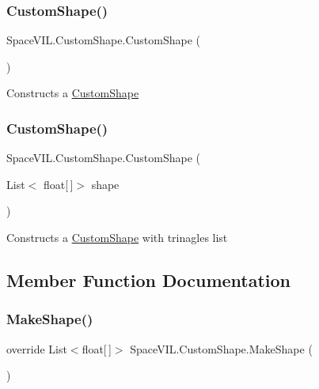 \subsubsection{\texorpdfstring{Custom\+Shape()}{CustomShape()}\hspace{0.1cm}{\footnotesize\ttfamily [1/2]}}
{\footnotesize\ttfamily Space\+V\+I\+L.\+Custom\+Shape.\+Custom\+Shape (\begin{DoxyParamCaption}{ }\end{DoxyParamCaption})}



Constructs a \mbox{\hyperlink{class_space_v_i_l_1_1_custom_shape}{Custom\+Shape}} 

\mbox{\label{class_space_v_i_l_1_1_custom_shape_ad5b5ff7c5f594e7b7fcde384b8cb6d0b}} 
\subsubsection{\texorpdfstring{Custom\+Shape()}{CustomShape()}\hspace{0.1cm}{\footnotesize\ttfamily [2/2]}}
{\footnotesize\ttfamily Space\+V\+I\+L.\+Custom\+Shape.\+Custom\+Shape (\begin{DoxyParamCaption}\item[{List$<$ float\mbox{[}$\,$\mbox{]}$>$}]{shape }\end{DoxyParamCaption})}



Constructs a \mbox{\hyperlink{class_space_v_i_l_1_1_custom_shape}{Custom\+Shape}} with trinagles list 



\subsection{Member Function Documentation}
\mbox{\label{class_space_v_i_l_1_1_custom_shape_aa8a1eb76ab361eea35540787f79fac6f}} 
\subsubsection{\texorpdfstring{Make\+Shape()}{MakeShape()}}
{\footnotesize\ttfamily override List$<$float\mbox{[}$\,$\mbox{]}$>$ Space\+V\+I\+L.\+Custom\+Shape.\+Make\+Shape (\begin{DoxyParamCaption}{ }\end{DoxyParamCaption})\hspace{0.3cm}{\ttfamily [virtual]}}



